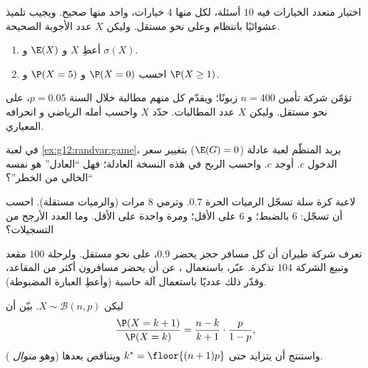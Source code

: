 \begin{exercise}[$\star$]\label{exo:g12:randvar:2}
اختبار متعدد الخيارات فيه $10$ أسئلة، لكل منها $4$ خيارات، واحد
منها صحيح. ويجيب تلميذ عشوائيًا بانتظام وعلى نحو مستقل.
وليكن $X$ عدد الأجوبة الصحيحة.
\begin{enumerate}
  \item أعطِ  $X$ و $\E(X)$ و $\sigma(X)$.
  \item احسب $\P(X = 0)$ و $\P(X = 5)$ و $\P(X \geq 1)$.
\end{enumerate}
\end{exercise}

\begin{exercise}[$\star$]\label{exo:g12:randvar:3}
تؤمّن شركة تأمين $n = 400$ زبونًا؛ ويقدّم كل منهم مطالبة خلال
السنة  $p = 0.05$، على نحو مستقل. وليكن $X$ عدد
المطالبات. حدّد  $X$ واحسب أمله الرياضي و
انحرافه المعياري.
\end{exercise}

\begin{exercise}[$\star\star$]\label{exo:g12:randvar:4}
في لعبة \cref{ex:g12:randvar:game}، يريد المنظّم لعبة عادلة
($\E(G) = 0$) بتغيير سعر الدخول $c$. أوجد $c$. واحسب
 الربح في هذه النسخة العادلة؛ فهل ``العادل'' هو نفسه
``الخالي من الخطر''؟
\end{exercise}

\begin{exercise}[$\star\star$]\label{exo:g12:randvar:5}
لاعبة كرة سلة تسجّل الرميات الحرة  $0.7$. وترمي
$8$ مرات (والرميات مستقلة). احسب  أن تسجّل:
$6$ بالضبط؛ و $6$ على الأقل؛ ومرة واحدة على الأقل. وما العدد الأرجح
من التسجيلات؟
\end{exercise}

\begin{exercise}[$\star\star$]\label{exo:g12:randvar:6}
تعرف شركة طيران أن كل مسافر حجز يحضر 
$0.9$، على نحو مستقل. ولرحلة $100$ مقعد وتبيع الشركة $104$
تذكرة. عبّر، باستعمال ، عن  أن يحضر
مسافرون أكثر من المقاعد، وقدّر ذلك عدديًا باستعمال
آلة حاسبة (وأعطِ العبارة المضبوطة).
\end{exercise}

\begin{exercise}[$\star\star$]\label{exo:g12:randvar:7}
ليكن $X \sim \mathcal B(n, p)$. بيّن أن
\[
\frac{\P(X = k+1)}{\P(X = k)} = \frac{n-k}{k+1}\cdot\frac{p}{1-p},
\]
واستنتج أن  يتزايد حتى
$k^* = \floor{(n+1)p}$ ويتناقص بعدها (وهو \emph{منوال}
).
\end{exercise}

